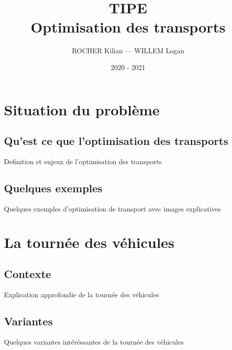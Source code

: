 \documentclass[handout]{beamer}
\title[TIPE — Optimisation des transports]{TIPE \\ Optimisation des transports}
\author{ROCHER Kilian — WILLEM Logan}
\date{2020 - 2021}
\begin{document}
	\begin{frame}[plain]
		\maketitle
	\end{frame}

	\begin{frame}[plain]
		\tableofcontents
	\end{frame}

	\section{Situation du problème}
	
	\subsection{Qu'est ce que l'optimisation des transports}
	
	\begin{frame}
		Definition et enjeux de l'optimisation des transports
	\end{frame}
	
	\subsection{Quelques exemples}
	
	\begin{frame}
		Quelques exemples d'optimisation de transport avec images explicatives
	\end{frame}
	
	\section{La tournée des véhicules}
	
	\subsection{Contexte}
	
	\begin{frame}
		Explication approfondie de la tournée des véhicules
	\end{frame}

	\subsection{Variantes}
	
	\begin{frame}
		Quelques variantes intéréssantes de la tournée des véhicules
	\end{frame}
	
\end{document}
